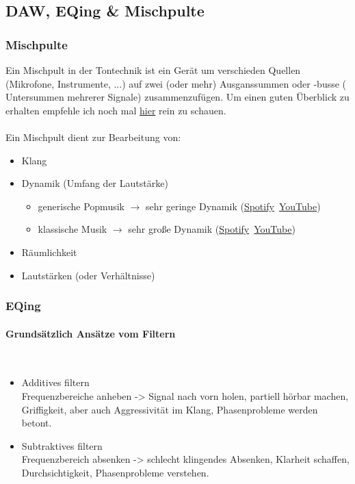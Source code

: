\subsection{DAW, EQing \& Mischpulte}

\subsubsection{Mischpulte}

Ein Mischpult in der Tontechnik ist ein Gerät um verschieden Quellen \\(Mikrofone, Instrumente, ...) auf zwei (oder mehr) Ausganssummen oder -busse ( Untersummen mehrerer Signale) zusammenzufügen. 
Um einen guten Überblick zu erhalten empfehle ich noch mal \href{https://www.tontechnik-seminar.de/mischpult/mischpult-beispiel/}{hier} rein zu schauen.\\~\\

Ein Mischpult dient zur Bearbeitung von:\vspace{-3mm}
\begin{itemize}
    \item Klang
    \item Dynamik (Umfang der Lautstärke)
        \begin{itemize}
            \item generische Popmusik $\rightarrow$ sehr geringe Dynamik (\href{https://open.spotify.com/intl-de/track/6wgmzw64fvWGVNfDRbOHFh?si=d58caac6be5c46d1}{Spotify}~\href{https://youtu.be/w6LCfdzK92I?si=DPN0Gv5c4ZKfD83w}{YouTube})~
            \item klassische Musik $\rightarrow$ sehr große Dynamik (\href{https://open.spotify.com/intl-de/track/3gFQOMoUwlR6aUZj81gCzu?si=92ac7cfb89344e18}{Spotify}~\href{https://youtu.be/fawhjImDdJA?si=hyUGufzkj1buqda6}{YouTube})
        \end{itemize}
    \item Räumlichkeit
    \item Lautstärken (oder Verhältnisse)
\end{itemize}


\subsubsection{EQing}

\paragraph{Grundsätzlich Ansätze vom Filtern}~\\
\begin{itemize}
    \item Additives filtern\\
    Frequenzbereiche anheben -> Signal nach vorn holen, partiell hörbar machen, Griffigkeit, aber auch Aggressivität im Klang, Phasenprobleme werden betont.
    \item Subtraktives filtern\\
    Frequenzbereich absenken -> schlecht klingendes Absenken, Klarheit schaffen, Durchsichtigkeit, Phasenprobleme verstehen.
\end{itemize}

